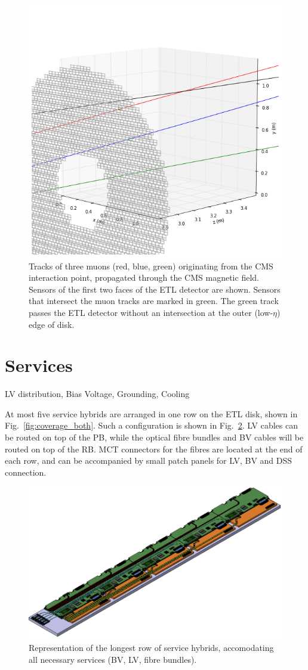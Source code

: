 \documentclass[11pt]{article}
\begin{document}
\begin{figure}[!h]
\centering
\includegraphics[width=0.70 \textwidth]{figures/intersect_3D.png}
\caption{
Tracks of three muons (red, blue, green) originating from the CMS interaction point, propagated through the CMS magnetic field.
Sensors of the first two faces of the ETL detector are shown.
Sensors that intersect the muon tracks are marked in green.
The green track passes the ETL detector without an intersection at the outer (low-$\eta$) edge of disk.
}
\label{fig:intersect}
\end{figure}

\section{Services}

LV distribution, Bias Voltage, Grounding, Cooling

At most five service hybrids are arranged in one row on the ETL disk, shown in Fig.~\ref{fig:coverage_both}.
Such a configuration is shown in Fig.~\ref{fig:services}.
LV cables can be routed on top of the PB, while the optical fibre bundles and BV cables will be routed on top of the RB.
MCT connectors for the fibres are located at the end of each row, and can be accompanied by small patch panels for LV, BV and DSS connection.

\begin{figure}[!h]
\centering
\includegraphics[width=0.90 \textwidth]{figures/services.png}
\caption{
Representation of the longest row of service hybrids, accomodating all necessary services (BV, LV, fibre bundles).
}
\label{fig:services}
\end{figure}
\end{document}
